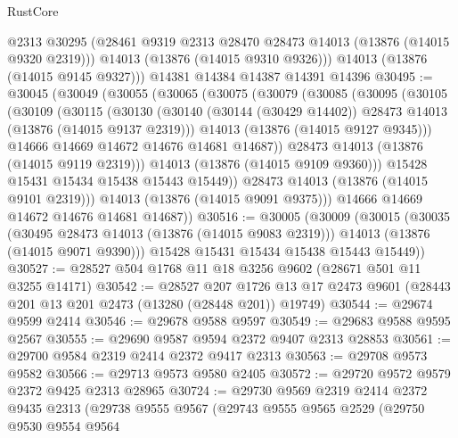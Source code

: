 \begin{lexlean}{RustCore}
\begin{coremodule}
        @2313
        @30295
        (@28461 @9319 @2313 @28470 @28473 @14013 (@13876 (@14015 @9320 @2319)))
        @14013
        (@13876 (@14015 @9310 @9326)))
      @14013
      (@13876 (@14015 @9145 @9327)))
    @14381
    @14384
    @14387
    @14391
    @14396
@30495 := @30045
    (@30049
      (@30055
        (@30065
          (@30075
            (@30079
              (@30085
                (@30095
                  (@30105
                    (@30109
                      (@30115
                        (@30130
                          (@30140
                            (@30144 (@30429 @14402))
                            @28473
                            @14013
                            (@13876 (@14015 @9137 @2319)))
                          @14013
                          (@13876 (@14015 @9127 @9345)))
                        @14666
                        @14669
                        @14672
                        @14676
                        @14681
                        @14687))
                    @28473
                    @14013
                    (@13876 (@14015 @9119 @2319)))
                  @14013
                  (@13876 (@14015 @9109 @9360)))
                @15428
                @15431
                @15434
                @15438
                @15443
                @15449))
            @28473
            @14013
            (@13876 (@14015 @9101 @2319)))
          @14013
          (@13876 (@14015 @9091 @9375)))
        @14666
        @14669
        @14672
        @14676
        @14681
        @14687))
@30516 := @30005
    (@30009
      (@30015
        (@30035
          (@30495 @28473 @14013 (@13876 (@14015 @9083 @2319)))
          @14013
          (@13876 (@14015 @9071 @9390)))
        @15428
        @15431
        @15434
        @15438
        @15443
        @15449))
@30527 := @28527 @504 @1768 @11 @18 @3256 @9602 (@28671 @501 @11 @3255 @14171)
@30542 := @28527
    @207
    @1726
    @13
    @17
    @2473
    @9601
    (@28443 @201 @13 @201 @2473 (@13280 (@28448 @201)) @19749)
@30544 := @29674 @9599 @2414
@30546 := @29678 @9588 @9597
@30549 := @29683 @9588 @9595 @2567
@30555 := @29690 @9587 @9594 @2372 @9407 @2313 @28853
@30561 := @29700 @9584 @2319 @2414 @2372 @9417 @2313
@30563 := @29708 @9573 @9582
@30566 := @29713 @9573 @9580 @2405
@30572 := @29720 @9572 @9579 @2372 @9425 @2313 @28965
@30724 := @29730
    @9569
    @2319
    @2414
    @2372
    @9435
    @2313
    (@29738
      @9555
      @9567
      (@29743
        @9555
        @9565
        @2529
        (@29750
          @9530
          @9554
          @9564

\end{coremodule}
\end{lexlean}
